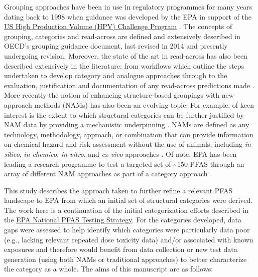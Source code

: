 \documentclass[
  super,
  preprint,
  3p]{elsarticle}
\begin{document}
Grouping approaches have been in use in regulatory programmes for many
years dating back to 1998 when guidance was developed by the EPA in
support of the
\href{https://nepis.epa.gov/Exe/ZyPURL.cgi?Dockey=P1004QXK.TXT}{US High
Production Volume (HPV) Challenge Program} \citep{usepa_2004_hpv}. The
concepts of grouping, categories and read-across are defined and
extensively described in OECD's grouping guidance document, last revised
in 2014 \citep{oecd_guidance_2017} and presently undergoing revision.
Moreover, the state of the art in read-across has also been described
extensively in the literature; from workflows which outline the steps
undertaken to develop category and analogue approaches through to the
evaluation, justification and documentation of any read-across
predictions made
\citep{cronin_chapter_2013, escher_towards_2019, patlewicz_navigating_2018, patlewicz_towards_2023}.
More recently the notion of enhancing structure-based groupings with new
approach methods (NAMs) has also been an evolving topic. For example, of
keen interest is the extent to which structural categories can be
further justified by NAM data by providing a mechanistic underpinning
\citep{escher_towards_2019, patlewicz_navigating_2018, patlewicz_towards_2022, patlewicz_towards_2023}.
NAMs are defined as any technology, methodology, approach, or
combination that can provide information on chemical hazard and risk
assessment without the use of animals, including \emph{in silico},
\emph{in chemico}, \emph{in vitro}, and \emph{ex vivo} approaches
\citep{stucki_2022}. Of note, EPA has been leading a research programme
to test a targeted set of \textasciitilde150 PFAS through an array of
different NAM approaches as part of a category approach
\citep{carstens_evaluation_2023, houck_bioactivity_2021, houck_evaluation_2023, kreutz_category-based_2023, patlewicz_towards_2022, smeltz_plasma_2023, smeltz_targeted_2023, stoker_high-throughput_2023, degitz_2024}.

This study describes the approach taken to further refine a relevant
PFAS landscape to EPA from which an initial set of structural categories
were derived. The work here is a continuation of the initial
categorization efforts described in the
\href{https://www.epa.gov/assessing-and-managing-chemicals-under-tsca/national-pfas-testing-strategy}{EPA
National PFAS Testing Strategy}. For the categories developed, data gaps
were assessed to help identify which categories were particularly data
poor (e.g., lacking relevant repeated dose toxicity data) and/or
associated with known exposures and therefore would benefit from data
collection or new test data generation (using both NAMs or traditional
approaches) to better characterize the category as a whole. The aims of
this manuscript are as follows:
\end{document}
